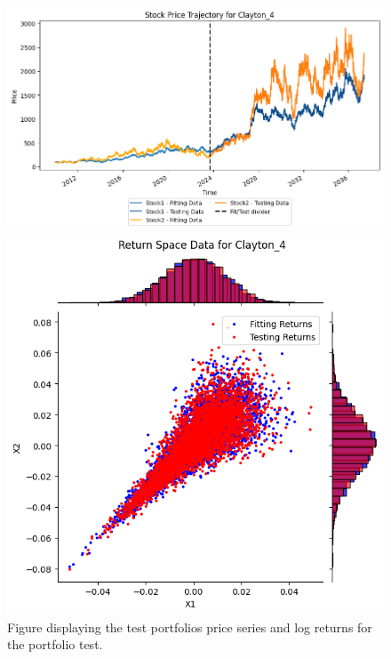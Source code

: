 \begin{figure}
\begin{minipage}{0.9\textwidth}
\begin{minipage}{0.34\textwidth}
        \end{minipage}
    \end{minipage}
    \hfill
    \begin{minipage}{0.9\textwidth}
        \centering
        \begin{minipage}{0.54\textwidth}
            \centering
            \includegraphics[width=\textwidth]{4Method/pictures/PricesClayton_4.png}
        \end{minipage}
        \hfill
        \begin{minipage}{0.34\textwidth}
            \centering
            \includegraphics[width=\textwidth]{4Method/pictures/ReturnsClayton_4.png}
        \end{minipage}
    \end{minipage}
    \caption{Figure displaying the test portfolios price series and log returns for the portfolio test.}
    \label{fig:DatasetsUsed}
\end{figure}


